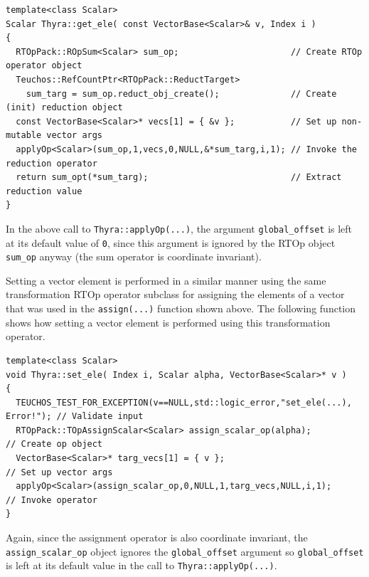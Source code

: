 \documentclass[pdf,ps2pdf,11pt]{SANDreport}
\begin{document}
{\scriptsize\begin{verbatim}
template<class Scalar>
Scalar Thyra::get_ele( const VectorBase<Scalar>& v, Index i )
{
  RTOpPack::ROpSum<Scalar> sum_op;                      // Create RTOp operator object
  Teuchos::RefCountPtr<RTOpPack::ReductTarget>
    sum_targ = sum_op.reduct_obj_create();              // Create (init) reduction object
  const VectorBase<Scalar>* vecs[1] = { &v };           // Set up non-mutable vector args
  applyOp<Scalar>(sum_op,1,vecs,0,NULL,&*sum_targ,i,1); // Invoke the reduction operator
  return sum_opt(*sum_targ);                            // Extract reduction value
}
\end{verbatim}}

{}\noindent{}In the above call to {}\texttt{Thyra::applyOp(\-...)},
the argument {}\texttt{global\_offset} is left at its default value of
{}\texttt{0}, since this argument is ignored by the RTOp object
{}\texttt{sum\_op} anyway (the sum operator is coordinate invariant).

Setting a vector element is performed in a similar manner using the
same transformation RTOp operator subclass for assigning the elements
of a vector that was used in the {}\texttt{assign(...)} function shown
above.  The following function shows how setting a vector element is
performed using this transformation operator.

{\scriptsize\begin{verbatim}
template<class Scalar>
void Thyra::set_ele( Index i, Scalar alpha, VectorBase<Scalar>* v )
{
  TEUCHOS_TEST_FOR_EXCEPTION(v==NULL,std::logic_error,"set_ele(...), Error!"); // Validate input
  RTOpPack::TOpAssignScalar<Scalar> assign_scalar_op(alpha);           // Create op object
  VectorBase<Scalar>* targ_vecs[1] = { v };                            // Set up vector args
  applyOp<Scalar>(assign_scalar_op,0,NULL,1,targ_vecs,NULL,i,1);       // Invoke operator
}
\end{verbatim}}

{}\noindent{}Again, since the assignment operator is also coordinate
invariant, the {}\texttt{assign\_scalar\_op} object ignores the
{}\texttt{global\_offset} argument so {}\texttt{global\_offset} is
left at its default value in the call to
{}\texttt{Thyra::applyOp(\-...)}.
\end{document}
